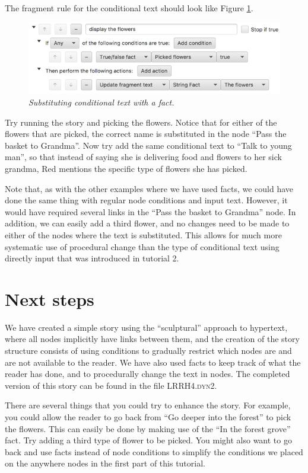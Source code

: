 \documentclass{article}
\begin{document}
The fragment rule for the conditional text should look like Figure \ref{fig:tut3:conditional_text}.

\begin{figure}[h]
  \centering
  \includegraphics[width=12cm]{images/hypedyn-tutorial-3-figure-12}
  \caption{\textit{Substituting conditional text with a fact.}}
  \label{fig:tut3:conditional_text}
\end{figure}

Try running the story and picking the flowers. Notice that for either of the flowers that are picked, the correct name is substituted in the node ``Pass the basket to Grandma''. Now try add the same conditional text to ``Talk to young man'', so that instead of saying she is delivering food and flowers to her sick grandma, Red mentions the specific type of flowers she has picked.

Note that, as with the other examples where we have used facts, we could have done the same thing with regular node conditions and input text. However, it would have required several links in the ``Pass the basket to Grandma'' node. In addition, we can easily add a third flower, and no changes need to be made to either of the nodes where the text is substituted. This allows for much more systematic use of procedural change than the type of conditional text using directly input that was introduced in tutorial 2.

\section{Next steps}

We have created a simple story using the ``sculptural'' approach to hypertext, where all nodes implicitly have links between them, and the creation of the story structure consists of using conditions to gradually restrict which nodes are and are not available to the reader. We have also used facts to keep track of what the reader has done, and to procedurally change the text in nodes. The completed version of this story can be found in the file \textsc{LRRH4.dyn2}.

There are several things that you could try to enhance the story. For example, you could allow the reader to go back from ``Go deeper into the forest'' to pick the flowers. This can easily be done by making use of the ``In the forest grove'' fact. Try adding a third type of flower to be picked. You might also want to go back and use facts instead of node conditions to simplify the conditions we placed on the anywhere nodes in the first part of this tutorial.
\end{document}

